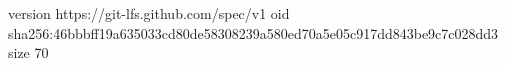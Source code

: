 version https://git-lfs.github.com/spec/v1
oid sha256:46bbbff19a635033cd80de58308239a580ed70a5e05c917dd843be9c7c028dd3
size 70
